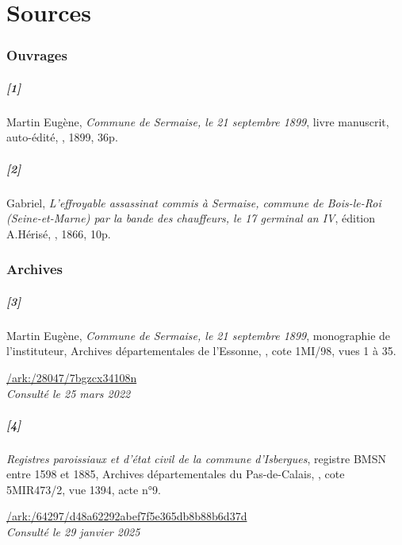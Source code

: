 \documentclass[../eBook.tex]{subfiles}
\begin{document}
  \chapter*{Sources}
    \subsection*{Ouvrages}
      \paragraph{[1]} Martin Eugène, \textit{Commune de Sermaise, le 21 septembre 1899}, livre manuscrit, auto-édité, , 1899, 36p.
      \paragraph{[2]} Gabriel, \textit{L'effroyable assassinat commis à Sermaise, commune de Bois-le-Roi (Seine-et-Marne) par la bande des chauffeurs, le 17 germinal an IV}, édition A.Hérisé, , 1866, 10p.

    \subsection*{Archives}
      \paragraph{[3]} Martin Eugène, \textit{Commune de Sermaise, le 21 septembre 1899}, monographie de l'instituteur, Archives départementales de l’Essonne, , cote 1MI/98, vues 1 à 35.
      \medskip

      \hspace*{\fill}\href{https://archives.essonne.fr/ark:/28047/7bgzcx34108n}{\color{blue}/ark:/28047/7bgzcx34108n}\\
      \hspace*{\fill}\textit{Consulté le 25 mars 2022}
      \paragraph{[4]}\textit{Registres paroissiaux et d'état civil de la commune d'Isbergues}, registre BMSN entre 1598 et 1885, Archives départementales du Pas-de-Calais, , cote 5MIR473/2, vue 1394, acte n°9.
      \medskip

      \hspace*{\fill}\href{https://archivesenligne.pasdecalais.fr/v2/ark:/64297/d48a62292abef7f5e365db8b88b6d37d}{\color{blue}/ark:/64297/d48a62292abef7f5e365db8b88b6d37d}\\
      \hspace*{\fill}\textit{Consulté le 29 janvier 2025}
\end{document}
